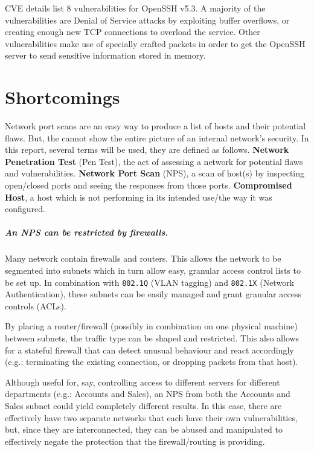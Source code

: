\documentclass[a4paper]{article}
\begin{document}
CVE details list 8 vulnerabilities for OpenSSH v5.3.
A majority of the vulnerabilities are Denial of Service attacks by exploiting buffer overflows, or creating enough new TCP connections to overload the service.
Other vulnerabilities make use of specially crafted packets in order to get the OpenSSH server to send sensitive information stored in memory.

\section{Shortcomings}
Network port scans are an easy way to produce a list of hosts and their potential flaws.
But, the cannot show the entire picture of an internal network's security.
In this report, several terms will be used, they are defined as follows.
\textbf{Network Penetration Test} (Pen Test), the act of assessing a network for potential flaws and vulnerabilities.
\textbf{Network Port Scan} (NPS), a scan of host(s) by inspecting open/closed ports and seeing the responses from those ports.
\textbf{Compromised Host}, a host which is not performing in its intended use/the way it was configured.


\subparagraph{An NPS can be restricted by firewalls.}
Many network contain firewalls and routers.
This allows the network to be segmented into subnets which in turn allow easy, granular access control lists to be set up.
In combination with \texttt{802.1Q} (VLAN tagging) and \texttt{802.1X} (Network Authentication), these subnets can be easily managed and grant granular access controls (ACLs).

By placing a router/firewall (possibly in combination on one physical machine) between subnets, the traffic type can be shaped and restricted.
This also allows for a stateful firewall that can detect unusual behaviour and react accordingly (e.g.: terminating the existing connection, or dropping packets from that host).

Although useful for, say, controlling access to different servers for different departments (e.g.: Accounts and Sales), an NPS from both the Accounts and Sales subnet could yield completely different results.
In this case, there are effectively have two separate networks that each have their own vulnerabilities, but, since they are interconnected, they can be abused and manipulated to effectively negate the protection that the firewall/routing is providing.
\end{document}
